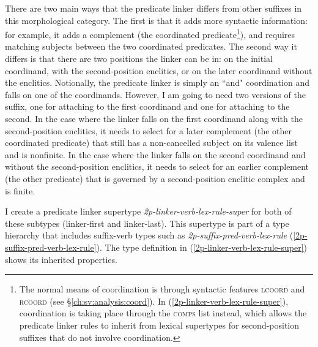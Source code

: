 There are two main ways that the predicate linker differs from other suffixes in this morphological category. The first is that it adds more syntactic information: for example, it adds a complement (the coordinated predicate\footnote{The normal means of coordination is through syntactic features \textsc{lcoord} and \textsc{rcoord} (see \S\ref{ch:sv:analysis:coord}). In (\ref{2p-linker-verb-lex-rule-super}), coordination is taking place through the \textsc{comps} list instead, which allows the predicate linker rules to inherit from lexical supertypes for second-position suffixes that do not involve coordination.}), and requires matching subjects between the two coordinated predicates. The second way it differs is that there are two positions the linker can be in: on the initial coordinand, with the second-position enclitics, or on the later coordinand without the enclitics. Notionally, the predicate linker is simply an ``and" coordination and falls on one of the coordinands. However, I am going to need two versions of the suffix, one for attaching to the first coordinand and one for attaching to the second. In the case where the linker falls on the first coordinand along with the second-position enclitics, it needs to select for a later complement (the other coordinated predicate) that still has a non-cancelled subject on its valence list and is nonfinite. In the case where the linker falls on the second coordinand and without the second-position enclitics, it needs to select for an earlier complement (the other predicate) that is governed by a second-position enclitic complex and is finite.

I create a predicate linker supertype {\textit{2p-linker-verb-lex-rule-super}} for both of these subtypes (linker-first and linker-last). This supertype is part of a type hierarchy that includes suffix-verb types such as {\textit{2p-suffix-pred-verb-lex-rule}} (\ref{2p-suffix-pred-verb-lex-rule}). The type definition in (\ref{2p-linker-verb-lex-rule-super}) shows its inherited properties.

